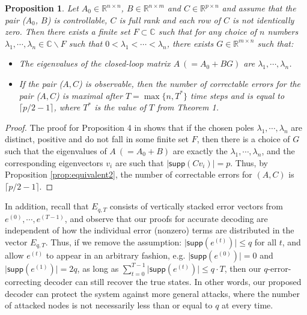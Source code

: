 \documentclass[journal]{IEEEtran}
\newtheorem{prop}{\bf{Proposition}}
\begin{document}
\begin{prop}\label{prop:maximum} 
Let $A_0 \in \mathbb{R}^{n \times n}$, $B \in \mathbb{R}^{n \times m}$ and $C \in \mathbb{R}^{p \times n}$ and assume that the pair ($A_0$, $B$) is controllable, $C$ is full rank and each row of $C$ is not identically zero. Then there exists a finite set $F \subset \mathbb{C}$ such that for any choice of $n$ numbers $\lambda_1, \cdots, \lambda_n \in \mathbb{C} \backslash F$ such that $0<\lambda_1< \cdots < \lambda_n$, there exists $G \in \mathbb{R}^{m \times n}$ such that:
\begin{itemize}
\item
The eigenvalues of the closed-loop matrix $A~(= A_0+BG)$ are $\lambda_1, \cdots, \lambda_n$.
\item
If the pair ($A, C$) is observable, then the number of correctable errors for the pair ($A, C$) is maximal after $T= \max\{n, T^*\}$ time steps and is equal to $\lceil p/2-1 \rceil$, where $T^*$ is the value of $T$ from Theorem 1. 
\end{itemize}
\end{prop}

\begin{proof}
The proof for Proposition 4 in \cite{Fawzi2014} shows that if the chosen poles $\lambda_1, \cdots, \lambda_n$ are distinct, positive and do not fall in some finite set $F$, then there is a choice of $G$ such that the eigenvalues of $A~(=A_0+B)$ are exactly the $\lambda_1, \cdots, \lambda_n$, and the corresponding eigenvectors $v_i$ are such that $\lvert \textsf{supp} (C v_i) \rvert = p$. Thus, by Proposition \ref{prop:equivalent2}, the number of correctable errors for $(A,C)$ is $\lceil p/2-1 \rceil$.
\end{proof}





In addition, recall that $E_{q,T}$ consists of vertically stacked error vectors from $e^{(0)}, \cdots, e^{(T-1)}$, and observe that our proofs for accurate decoding are independent of how the individual error (nonzero) terms are distributed in the vector $E_{q,T}$. Thus, if we remove the assumption: $\lvert \textsf{supp} (e^{(t)}) \rvert \le q$ for all $t$, and allow $e^{(t)}$ to appear in an arbitrary fashion, e.g. $\lvert \textsf{supp} (e^{(0)}) \rvert = 0$ and $\lvert \textsf{supp} (e^{(1)}) \rvert = 2q$, as long as $\sum_{t=0}^{T-1} \lvert \textsf{supp} (e^{(t)}) \rvert \leq q\cdot T$, then our $q$-error-correcting decoder can still recover the true states. In other words, our proposed decoder can protect the system against more general attacks, where the number of attacked nodes is not necessarily less than or equal to $q$ at every time.
\end{document}

